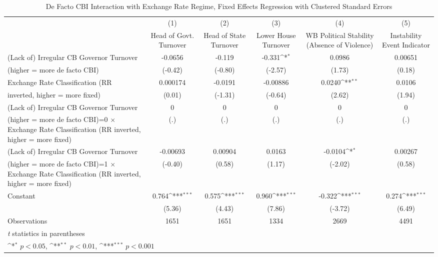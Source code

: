\begin{table}[htbp]\centering
\def\sym#1{\ifmmode^{#1}\else\(^{#1}\)\fi}
\caption{De Facto CBI Interaction with Exchange Rate Regime, Fixed Effects Regression with Clustered Standard Errors \label{imultIndFEDF}}
\begin{tabular}{l*{5}{c}}
\toprule
                                        &\multicolumn{1}{c}{(1)}&\multicolumn{1}{c}{(2)}&\multicolumn{1}{c}{(3)}&\multicolumn{1}{c}{(4)}&\multicolumn{1}{c}{(5)}\\
                                        &\multicolumn{1}{c}{Head of Govt. Turnover}&\multicolumn{1}{c}{Head of State Turnover}&\multicolumn{1}{c}{Lower House Turnover}&\multicolumn{1}{c}{WB Political Stability (Absence of Violence)}&\multicolumn{1}{c}{Instability Event Indicator}\\
\midrule
(Lack of) Irregular CB Governor Turnover&  -0.0656         &   -0.119         &   -0.331\sym{*}  &   0.0986         &  0.00651         \\
(higher = more de facto CBI)            &  (-0.42)         &  (-0.80)         &  (-2.57)         &   (1.73)         &   (0.18)         \\
\addlinespace
Exchange Rate Classification (RR        & 0.000174         &  -0.0191         & -0.00886         &   0.0240\sym{**} &   0.0106         \\
inverted, higher = more fixed)          &   (0.01)         &  (-1.31)         &  (-0.64)         &   (2.62)         &   (1.94)         \\
\addlinespace
(Lack of) Irregular CB Governor Turnover&        0         &        0         &        0         &        0         &        0         \\
(higher = more de facto CBI)=0 $\times$ Exchange Rate Classification (RR inverted, higher = more fixed)&      (.)         &      (.)         &      (.)         &      (.)         &      (.)         \\
\addlinespace
(Lack of) Irregular CB Governor Turnover& -0.00693         &  0.00904         &   0.0163         &  -0.0104\sym{*}  &  0.00267         \\
(higher = more de facto CBI)=1 $\times$ Exchange Rate Classification (RR inverted, higher = more fixed)&  (-0.40)         &   (0.58)         &   (1.17)         &  (-2.02)         &   (0.58)         \\
\addlinespace
Constant                                &    0.764\sym{***}&    0.575\sym{***}&    0.960\sym{***}&   -0.322\sym{***}&    0.274\sym{***}\\
                                        &   (5.36)         &   (4.43)         &   (7.86)         &  (-3.72)         &   (6.49)         \\
\midrule
Observations                            &     1651         &     1651         &     1334         &     2669         &     4491         \\
\bottomrule
\multicolumn{6}{l}{\footnotesize \textit{t} statistics in parentheses}\\
\multicolumn{6}{l}{\footnotesize \sym{*} \(p<0.05\), \sym{**} \(p<0.01\), \sym{***} \(p<0.001\)}\\
\end{tabular}
\end{table}
